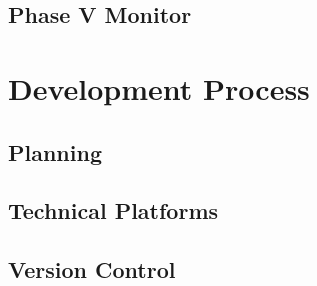 \subsection{Phase V Monitor}

\section{Development Process}

\subsection{Planning}
\subsection{Technical Platforms}
\subsection{Version Control}





